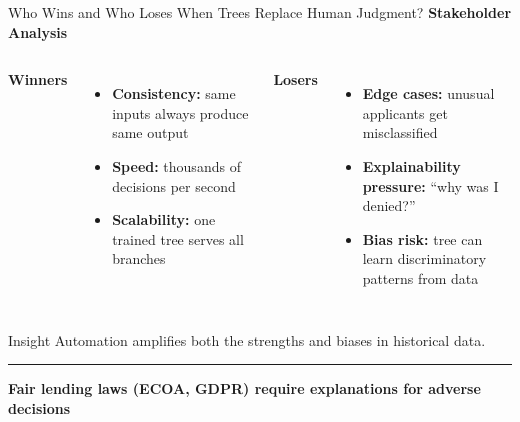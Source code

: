 \documentclass[8pt,aspectratio=169]{beamer}
\newcommand{\bottomnote}[1]{%
\vfill
\vspace{-2mm}
\textcolor{mllavender2}{\rule{\textwidth}{0.4pt}}
\vspace{1mm}
\footnotesize
\textbf{#1}
}
\newenvironment{compactlist}{%
  \begin{itemize}%
    \setlength{\itemsep}{2pt}%
    \setlength{\parskip}{0pt}%
    \setlength{\parsep}{0pt}%
}{%
  \end{itemize}%
}
\begin{document}
\begin{frame}[t]{Who Wins and Who Loses When Trees Replace Human Judgment?}
\small
\textbf{Stakeholder Analysis}
\begin{columns}[T]
\textbf{\textcolor{mlgreen}{Winners}}
\begin{compactlist}
\item \footnotesize \textbf{Consistency:} same inputs always produce same output
\item \footnotesize \textbf{Speed:} thousands of decisions per second
\item \footnotesize \textbf{Scalability:} one trained tree serves all branches
\end{compactlist}

\textbf{\textcolor{dfred}{Losers}}
\begin{compactlist}
\item \footnotesize \textbf{Edge cases:} unusual applicants get misclassified
\item \footnotesize \textbf{Explainability pressure:} ``why was I denied?''
\item \footnotesize \textbf{Bias risk:} tree can learn discriminatory patterns from data
\end{compactlist}
\end{columns}
\vspace{2mm}
\begin{block}{Insight}
\footnotesize Automation amplifies both the strengths and biases in historical data.
\end{block}
\bottomnote{Fair lending laws (ECOA, GDPR) require explanations for adverse decisions}
\end{frame}
\end{document}
